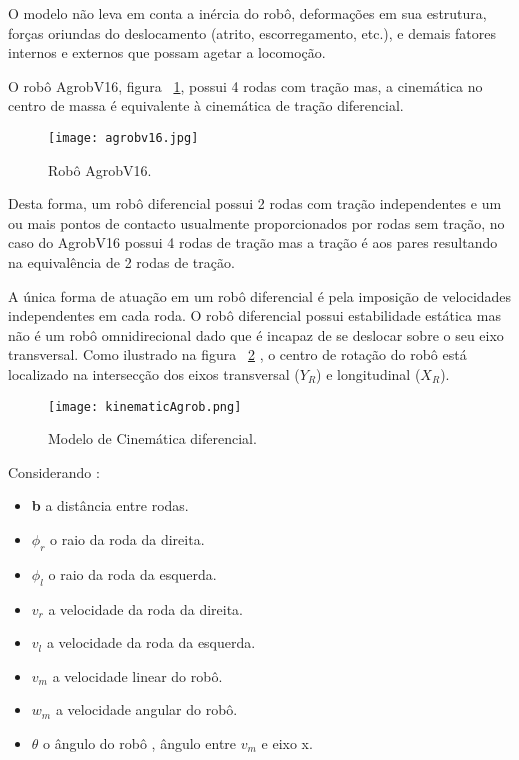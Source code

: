 O modelo não leva em conta a inércia do robô, deformações em sua estrutura, forças oriundas do deslocamento (atrito, escorregamento, etc.), e demais fatores internos e externos que possam agetar a locomoção.


O robô AgrobV16, figura ~\ref{fig:agrobv16}, possui 4 rodas com tração mas, a cinemática no centro de massa é equivalente à cinemática de tração diferencial. 

\begin{figure}[h!] %
	\begin{center}
		\leavevmode		
		\texttt{[image: agrobv16.jpg]}
		\caption{Robô AgrobV16.}
		\label{fig:agrobv16}
	\end{center}
\end{figure}


Desta forma, um robô diferencial possui 2 rodas com tração independentes e um ou mais pontos de contacto usualmente proporcionados por rodas sem tração, no caso do AgrobV16 possui 4 rodas de tração mas a tração é aos pares resultando na equivalência de 2 rodas de tração.

A única forma de atuação em um robô diferencial é pela imposição de velocidades independentes em cada roda. O robô diferencial possui estabilidade estática mas não é um robô omnidirecional dado que é incapaz de se deslocar sobre o seu eixo transversal. Como ilustrado na figura ~\ref{fig:kinematicAgrob} , o centro de rotação do robô está localizado na intersecção dos eixos transversal (\textbf{$Y_R$}) e longitudinal (\textbf{$X_R$}).

\begin{figure}[h!] %
	\begin{center}
		\leavevmode		
		\texttt{[image: kinematicAgrob.png]}
		\caption{Modelo de Cinemática diferencial.}
		\label{fig:kinematicAgrob}
	\end{center}
\end{figure}

Considerando : 
\begin{itemize}
	\item \textbf{b} a distância entre rodas.
	\item \textbf{$\phi_r$} o raio da roda da direita.
	\item \textbf{$\phi_l$} o raio da roda da esquerda.
	\item \textbf{$v_r$} a velocidade da roda da direita.
	\item \textbf{$v_l$} a velocidade da roda da esquerda.
	\item \textbf{$v_m$} a velocidade linear do robô.
	\item \textbf{$w_m$} a velocidade angular do robô.
	\item $\textbf{$\theta$}$ o ângulo do robô , ângulo entre $v_m$ e eixo x.
\end{itemize}

